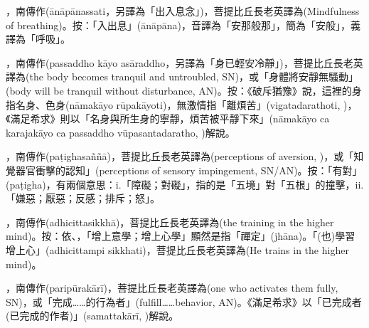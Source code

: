 \startitemgroup[noteitems]
\item{}，南傳作(ānāpānassati，另譯為「出入息念」)，菩提比丘長老英譯為(Mindfulness of breathing)。按：「入出息」(ānāpāna)，音譯為「安那般那」，簡為「安般」，義譯為「呼吸」。
\stopitemgroup

\startitemgroup[noteitems]
\item{}，南傳作(passaddho kāyo asāraddho，另譯為「身已輕安冷靜」)，菩提比丘長老英譯為(the body becomes tranquil and untroubled, SN)，或「身體將安靜無騷動」(body will be tranquil without disturbance, AN)。按：《破斥猶豫》說，這裡的身指名身、色身(nāmakāyo rūpakāyoti)，無激情指「離煩苦」(vigatadarathoti, )，《滿足希求》則以「名身與所生身的寧靜，煩苦被平靜下來」(nāmakāyo ca karajakāyo ca passaddho vūpasantadaratho, )解說。
\stopitemgroup

\startitemgroup[noteitems]
\item{}，南傳作(paṭighasaññā)，菩提比丘長老英譯為(perceptions of aversion, )，或「知覺器官衝擊的認知」(perceptions of sensory impingement, SN/AN)。按：「有對」(paṭigha)，有兩個意思：i.「障礙；對礙」，指的是「五境」對「五根」的撞擊，ii.「嫌惡；厭惡；反感；排斥；怒」。
\stopitemgroup

\startitemgroup[noteitems]
\item{}，南傳作(adhicittasikkhā)，菩提比丘長老英譯為(the training in the higher mind)。按：依、，「增上意學；增上心學」顯然是指「禪定」(jhāna)。「(也)學習增上心」(adhicittampi sikkhati)，菩提比丘長老英譯為(He trains in the higher mind)。
\stopitemgroup

\startitemgroup[noteitems]
\item{}，南傳作(paripūrakārī)，菩提比丘長老英譯為(one who activates them fully, SN)，或「完成……的行為者」(fulfill……behavior, AN)。《滿足希求》以「已完成者(已完成的作者)」(samattakārī, )解說。
\stopitemgroup


